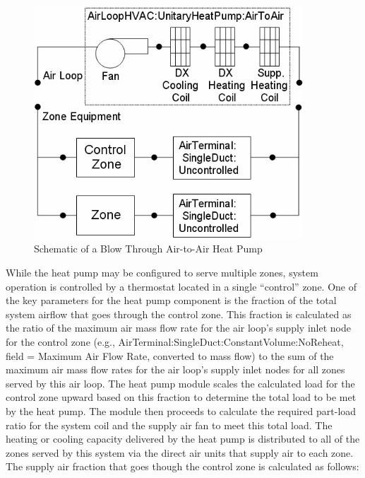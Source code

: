 \begin{figure}[hbtp] %
\centering
\includegraphics[width=0.9\textwidth, height=0.9\textheight, keepaspectratio=true]{media/image5106.png}
\caption{Schematic of a Blow Through Air-to-Air Heat Pump \protect \label{fig:schematic-of-a-blow-through-air-to-air-heat}}
\end{figure}

While the heat pump may be configured to serve multiple zones, system operation is controlled by a thermostat located in a single ``control'' zone. One of the key parameters for the heat pump component is the fraction of the total system airflow that goes through the control zone. This fraction is calculated as the ratio of the maximum air mass flow rate for the air loop's supply inlet node for the control zone (e.g., AirTerminal:SingleDuct:ConstantVolume:NoReheat, field = Maximum Air Flow Rate, converted to mass flow) to the sum of the maximum air mass flow rates for the air loop's supply inlet nodes for all zones served by this air loop. The heat pump module scales the calculated load for the control zone upward based on this fraction to determine the total load to be met by the heat pump. The module then proceeds to calculate the required part-load ratio for the system coil and the supply air fan to meet this total load. The heating or cooling capacity delivered by the heat pump is distributed to all of the zones served by this system via the direct air units that supply air to each zone. The supply air fraction that goes though the control zone is calculated as follows:


